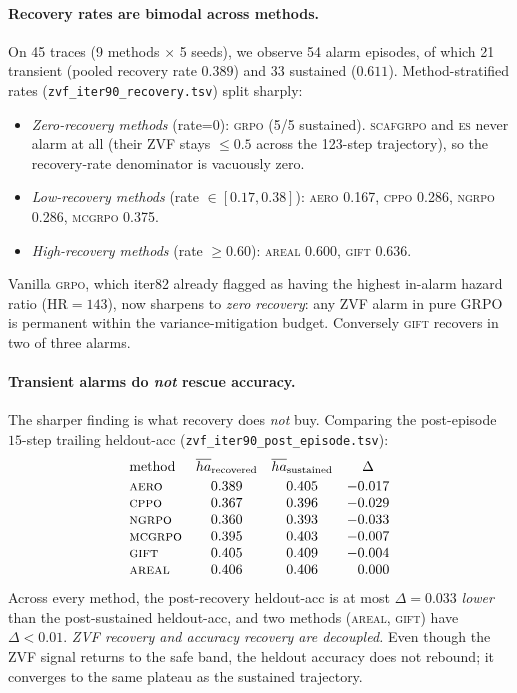 \paragraph{Recovery rates are bimodal across methods.}
On 45 traces (9 methods $\times$ 5 seeds), we observe 54 alarm
episodes, of which 21 transient (pooled recovery rate
$0.389$) and 33 sustained ($0.611$).
Method-stratified rates
(\texttt{zvf\_iter90\_recovery.tsv}) split sharply:
%
\begin{itemize}\itemsep1pt
  \item \emph{Zero-recovery methods} (rate=0):
        \textsc{grpo} (5/5 sustained).
        \textsc{scafgrpo} and \textsc{es} never alarm at all
        (their ZVF stays $\le 0.5$ across the 123-step trajectory),
        so the recovery-rate denominator is vacuously zero.
  \item \emph{Low-recovery methods} (rate $\in [0.17, 0.38]$):
        \textsc{aero} 0.167,
        \textsc{cppo} 0.286, \textsc{ngrpo} 0.286,
        \textsc{mcgrpo} 0.375.
  \item \emph{High-recovery methods} (rate $\ge 0.60$):
        \textsc{areal} 0.600, \textsc{gift} 0.636.
\end{itemize}
%
Vanilla \textsc{grpo}, which iter82 already flagged as having the
highest in-alarm hazard ratio ($\mathrm{HR}=143$), now sharpens to
\emph{zero recovery}: any ZVF alarm in pure GRPO is permanent within
the variance-mitigation budget. Conversely \textsc{gift} recovers in
two of three alarms.

\paragraph{Transient alarms do \emph{not} rescue accuracy.}
The sharper finding is what recovery does \emph{not} buy. Comparing
the post-episode $15$-step trailing heldout-acc
(\texttt{zvf\_iter90\_post\_episode.tsv}):
%
\begin{equation*}
  \begin{array}{lccc}
    \text{method} & \overline{ha}_{\text{recovered}} &
    \overline{ha}_{\text{sustained}} & \Delta \\[2pt]
    \textsc{aero}  & 0.389 & 0.405 & -0.017 \\
    \textsc{cppo}  & 0.367 & 0.396 & -0.029 \\
    \textsc{ngrpo} & 0.360 & 0.393 & -0.033 \\
    \textsc{mcgrpo}& 0.395 & 0.403 & -0.007 \\
    \textsc{gift}  & 0.405 & 0.409 & -0.004 \\
    \textsc{areal} & 0.406 & 0.406 & \phantom{-}0.000 \\
  \end{array}
\end{equation*}
%
Across every method, the post-recovery heldout-acc is at most
$\Delta=0.033$ \emph{lower} than the post-sustained heldout-acc, and
two methods (\textsc{areal}, \textsc{gift}) have $\Delta < 0.01$.
\emph{ZVF recovery and accuracy recovery are decoupled.} Even though
the ZVF signal returns to the safe band, the heldout accuracy does
not rebound; it converges to the same plateau as the sustained
trajectory.
%
